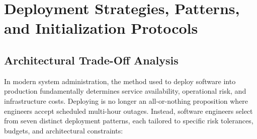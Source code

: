 \documentclass[11pt,a4paper]{article}
\begin{document}
\section[Deployment Strategies]{Deployment Strategies, Patterns, and Initialization Protocols}
\label{sec:deployment_strategies}

\subsection{Architectural Trade-Off Analysis}
In modern system administration, the method used to deploy software into production fundamentally determines service availability, operational risk, and infrastructure costs. Deploying is no longer an all-or-nothing proposition where engineers accept scheduled multi-hour outages. Instead, software engineers select from seven distinct deployment patterns, each tailored to specific risk tolerances, budgets, and architectural constraints:
\end{document}
